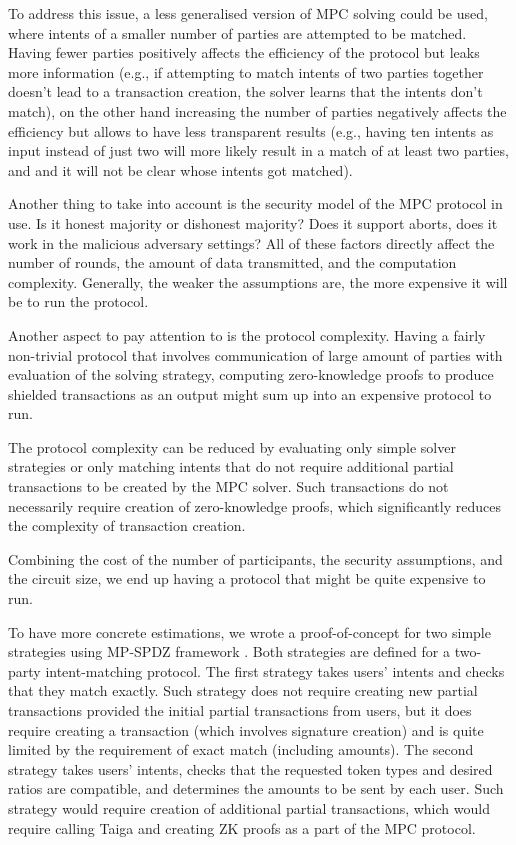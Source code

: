 \documentclass[
    9pt,            %
    report,        %
    affiltop,       %
]{art}
\begin{document}
To address this issue, a less generalised version of MPC solving could be used, where intents of a smaller number of parties are attempted to be matched. Having fewer parties positively affects the efficiency of the protocol but leaks more information (e.g., if attempting to match intents of two parties together doesn't lead to a transaction creation, the solver learns that the intents don't match), on the other hand increasing the number of parties negatively affects the efficiency but allows to have less transparent results (e.g., having ten intents as input instead of just two will more likely result in a match of at least two parties, and and it will not be clear whose intents got matched).

Another thing to take into account is the security model of the MPC protocol in use. Is it honest majority or dishonest majority? Does it support aborts, does it work in the malicious adversary settings? All of these factors directly affect the number of rounds, the amount of data transmitted, and the computation complexity. Generally, the weaker the assumptions are, the more expensive it will be to run the protocol.

Another aspect to pay attention to is the protocol complexity. Having a fairly non-trivial protocol that involves communication of large amount of parties with evaluation of the solving strategy, computing zero-knowledge proofs to produce shielded transactions as an output might sum up into an expensive protocol to run.

The protocol complexity can be reduced by evaluating only simple solver strategies or only matching intents that do not require additional partial transactions to be created by the MPC solver. Such transactions do not necessarily require creation of zero-knowledge proofs, which significantly reduces the complexity of transaction creation. 

Combining the cost of the number of participants, the security assumptions, and the circuit size, we end up having a protocol that might be quite expensive to run. 

To have more concrete estimations, we wrote a proof-of-concept \citep{mpc-poc} for two simple strategies using MP-SPDZ framework \citep{mpspdz}. Both strategies are defined for a two-party intent-matching protocol. The first strategy takes users' intents and checks that they match exactly. Such strategy does not require creating new partial transactions provided the initial partial transactions from users, but it does require creating a transaction (which involves signature creation) and is quite limited by the requirement of exact match (including amounts). The second strategy takes users' intents, checks that the requested token types and desired ratios are compatible, and determines the amounts to be sent by each user. Such strategy would require creation of additional partial transactions, which would require calling Taiga and creating ZK proofs as a part of the MPC protocol.
\end{document}
